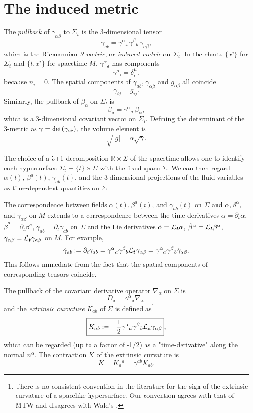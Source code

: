 \documentclass[12pt]{article}
\def\a{\alpha}
\def\b{\beta}
\def\g{\gamma}
\def\Lie{{\cal L}}
\def\be{\begin{equation}}
\def\ee{\end{equation}}
\newcommand{\pa}{\partial}
\def\a{\alpha}
\def\b{\beta}
\def\c{\gamma}
\begin{document}
{\section{The induced metric}

The {\it pullback} of $\gamma_{\alpha \beta}$ to $\Sigma_t$ is the 3-dimensional tensor 
\be 
\boxed{ \gamma_{ab} = \gamma^\alpha{}_a \,\gamma^\beta{}_b \,\gamma_{\alpha\beta}},\ee
 which is the Riemannian 
{\it 3-metric}, or {\it induced metric} on $\Sigma_t$.  In the charts 
$\{x^i\}$ for $\Sigma_t$ and $\{t,x^i\}$ for spacetime $M$, $\gamma^\alpha{}_a$
has components
\be
   \gamma^\mu{}_i = \delta_i^\mu,
\ee
because $n_i=0$. The spatial components of 
$\gamma_{ab}$, $\gamma_{\a\b}$ and $g_{\a\b}$ 
all coincide:
\be 
 \gamma_{ij} = g_{ij}.
\ee 
Similarly, the pullback of  $\beta_\alpha$ on $\Sigma_t$ is 
\be
\boxed{ \beta_a = \gamma^\alpha{}_a \,\beta_\alpha },
\ee
which is a 3-dimensional covariant vector on $\Sigma_t$. Defining the determinant of the 3-metric as $\c={\rm det}(\g_{ab})$, the
volume element is
\be
\sqrt{|g|}= \alpha\sqrt\gamma.
\ee

The choice of a 3+1 decomposition ${\mathbb R}\times \Sigma$ 
of the spacetime allows one to identify each hypersurface $\Sigma_t=\{t\}\times \Sigma$ with 
the fixed space $\Sigma$.  We can then regard $\alpha(t)$, $\beta^a(t)$, 
$\gamma_{ab}(t)$, and the 3-dimensional projections of the fluid variables 
as time-dependent quantities on $\Sigma$.   

The correspondence between fields $\alpha(t), \beta^a(t)$, 
and $\gamma_{ab}(t)$ on $\Sigma$ and $\alpha,\beta^\a$, and $\gamma_{\a\b}$ on $M$ extends 
to a correspondence between the time derivatives $\dot\a =\pa_t\a$, $\dot\beta^a=\pa_t\beta^a$, $\dot\g_{ab}=\pa_t\g_{ab}$ on $\Sigma$ and the Lie derivatives $\dot\a = \Lie_{\bm t}\a$, $\dot\beta^\a=\Lie_{\bm t}\beta^\a$, $\dot\g_{\a\b}=\Lie_{\bm t}\g_{\a\b}$ on $M$. For example, 
\be
 \dot\gamma_{ab} := \partial_t\gamma_{ab} = \g^\a{}_a\g^\b{}_b \Lie_{\bm
t} 
 \gamma_{\a\b}=\g^\a{}_a\g^\b{}_b \dot \gamma_{\a\b}.
\ee 
This follows immediate from the fact that the spatial components of corresponding tensors 
coincide. 
  


  

The pullback of the covariant derivative operator $\nabla_\alpha$ on $\Sigma$ is 
\be
D_a = \gamma^\alpha{}_a\nabla_\alpha.
\ee
   and the \textit{extrinsic curvature}  $K_{ab}$ of $\Sigma$ is defined as\footnote{There is no consistent convention in the literature for 
the sign of the extrinsic curvature of a spacelike hypersurface.  
Our convention agrees with that of MTW \cite{MTW} and disagrees with 
Wald's \cite{waldbook}.}
\be
\boxed{ K_{ab} := -\frac12\gamma^\a{}_a \gamma^\b{}_b \Lie_{\bf n} \gamma_{\a\b}},
\label{eq:kab0}\ee 
which can be regarded (up to a factor of -1/2) as a "time-derivative" along the normal $n^\alpha$. The contraction $K$ of the extrinsic curvature is 
\be
K=K_a{}^a = \gamma^{ab}K_{ab}.
\ee
\vskip0.5cm

}
\end{document}
